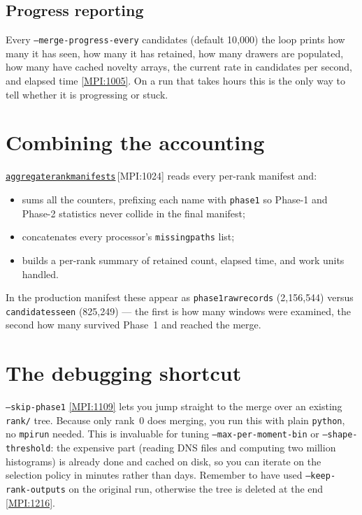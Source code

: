 \documentclass[11pt,a4paper]{report}
\newcommand{\srcbase}{vscode://file/Users/syellapa/Documents/Research/2026/ANSYS/Multi-ScalarPDF}
\newcommand{\srctag}[1]{{\footnotesize\textcolor{TagGray}{[#1]}}}
\newcommand{\Mpi}[2]{\href{\srcbase/EnsightPDFHybridDatasetMPI.py:#1}{\texttt{#2}}\,\srctag{MPI:#1}}
\newcommand{\MpiL}[1]{\href{\srcbase/EnsightPDFHybridDatasetMPI.py:#1}{\srctag{MPI:#1}}}
\newcommand{\code}[1]{\texttt{#1}}
\renewcommand{\_}{\origtextunderscore\allowbreak}
\begin{document}
\subsection*{Progress reporting}

Every \code{--merge-progress-every} candidates (default 10{,}000) the loop prints how many it
has seen, how many it has retained, how many drawers are populated, how many have cached
novelty arrays, the current rate in candidates per second, and elapsed time \MpiL{1005}. On a
run that takes hours this is the only way to tell whether it is progressing or stuck.

\section{Combining the accounting}

\Mpi{1024}{aggregate\_rank\_manifests} reads every per-rank manifest and:

\begin{itemize}
  \item sums all the counters, prefixing each name with \code{phase1\_} so Phase-1 and
        Phase-2 statistics never collide in the final manifest;
  \item concatenates every processor's \code{missing\_paths} list;
  \item builds a per-rank summary of retained count, elapsed time, and work units handled.
\end{itemize}

In the production manifest these appear as \code{phase1\_raw\_records} (2{,}156{,}544) versus
\code{candidates\_seen} (825{,}249) --- the first is how many windows were examined, the second
how many survived Phase~1 and reached the merge.

\section{The debugging shortcut}

\code{--skip-phase1} \MpiL{1109} lets you jump straight to the merge over an existing
\code{\_rank/} tree. Because only rank~0 does merging, you run this with plain
\code{python}, no \code{mpirun} needed. This is invaluable for tuning
\code{--max-per-moment-bin} or \code{--shape-threshold}: the expensive part (reading DNS files
and computing two million histograms) is already done and cached on disk, so you can iterate
on the selection policy in minutes rather than days. Remember to have used
\code{--keep-rank-outputs} on the original run, otherwise the tree is deleted at the end
\MpiL{1216}.
\end{document}
